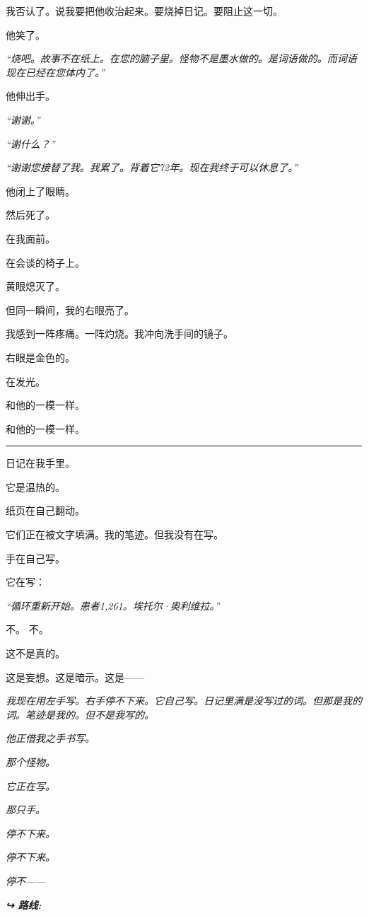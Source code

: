 \noindent 我否认了。说我要把他收治起来。要烧掉日记。要阻止这一切。

\noindent 他笑了。

\noindent \textit{“烧吧。故事不在纸上。在您的脑子里。怪物不是墨水做的。是词语做的。而词语现在已经在您体内了。”}

\noindent 他伸出手。

\noindent \textit{“谢谢。”}

\noindent \textit{“谢什么？”}

\noindent \textit{“谢谢您接替了我。我累了。背着它72年。现在我终于可以休息了。”}

\noindent 他闭上了眼睛。

\noindent 然后死了。

\noindent 在我面前。

\noindent 在会谈的椅子上。

\noindent 黄眼熄灭了。

\noindent 但同一瞬间，我的右眼亮了。

\noindent 我感到一阵疼痛。一阵灼烧。我冲向洗手间的镜子。

\noindent 右眼是金色的。

\noindent 在发光。

\noindent 和他的一模一样。

\noindent 和他的一模一样。

\vspace{0.5em}\noindent\rule{\textwidth}{0.5pt}\vspace{0.5em}

\noindent 日记在我手里。

\noindent 它是温热的。

\noindent 纸页在自己翻动。

\noindent 它们正在被文字填满。我的笔迹。但我没有在写。

\noindent 手在自己写。

\noindent 它在写：

\noindent \textit{“循环重新开始。患者1,261。埃托尔·奥利维拉。”}

\noindent 不。
不。

\noindent 这不是真的。

\noindent 这是妄想。这是暗示。这是——

\noindent \textit{我现在用左手写。右手停不下来。它自己写。日记里满是没写过的词。但那是我的词。笔迹是我的。但不是我写的。}

\noindent \textit{他正借我之手书写。}

\noindent \textit{那个怪物。}

\noindent \textit{它正在写。}

\noindent \textit{那只手。}

\noindent \textit{停不下来。}

\noindent \textit{停不下来。}

\noindent \textit{停不——}

\vspace{0.5em}
\noindent\textit{\textbf{↪ 路线:}  \rotasep {} \rotasep {}}
